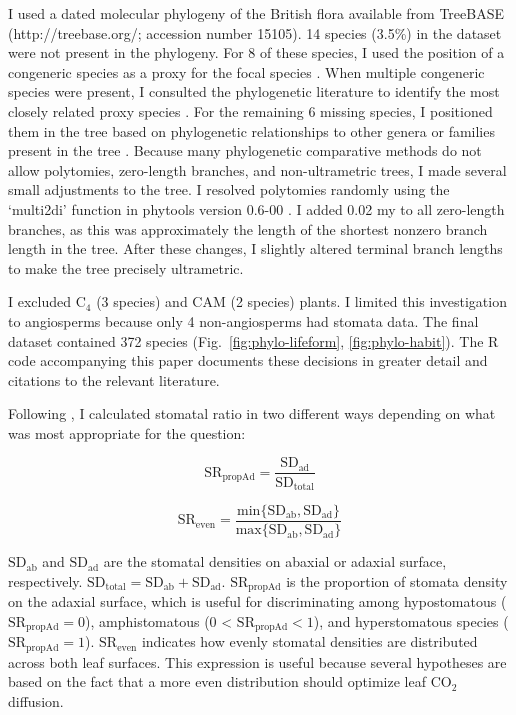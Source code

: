 \documentclass[12pt, oneside]{article}
\newcommand{\pkg}[1]{{\fontseries{b}\selectfont #1}}
\begin{document}
I used a dated molecular phylogeny of the British flora \citep{Lim_etal_2014} available from TreeBASE (http://treebase.org/; accession number 15105). 14 species (3.5\%) in the dataset were not present in the phylogeny. For 8 of these species, I used the position of a congeneric species as a proxy for the focal species \citep[following][]{Pennell_etal_2016}. When multiple congeneric species were present, I consulted the phylogenetic literature to identify the most closely related proxy species \citep{Scheen_etal_2004, Salmaki_etal_2013}. For the remaining 6 missing species, I positioned them in the tree based on phylogenetic relationships to other genera or families present in the tree \citep{Fior_etal_2006}. Because many phylogenetic comparative methods do not allow polytomies, zero-length branches, and non-ultrametric trees, I made several small adjustments to the tree. I resolved polytomies randomly using the `multi2di' function in \pkg{phytools} version 0.6-00 \citep{Revell_2012}. I added 0.02 my to all zero-length branches, as this was approximately the length of the shortest nonzero branch length in the tree. After these changes, I slightly altered terminal branch lengths to make the tree precisely ultrametric.

I excluded C$_4$ (3 species) and CAM (2 species) plants. I limited this investigation to angiosperms because only 4 non-angiosperms had stomata data. The final dataset contained 372 species (Fig.~\ref{fig:phylo-lifeform}, \ref{fig:phylo-habit}). The R code accompanying this paper documents these decisions in greater detail and citations to the relevant literature.

Following \cite{Muir_2015}, I calculated stomatal ratio in two different ways depending on what was most appropriate for the question: 

\begin{equation} \label{eq:SRpropAd} 
  \mathrm{SR_{propAd}} = \frac{\mathrm{SD_{ad}}}{\mathrm{SD_{total}}}
\end{equation}

\begin{equation} \label{eq:SReven1} 
  \mathrm{SR_{even}} = \frac{\mathrm{min}\{\mathrm{SD_{ab}}, \mathrm{SD_{ad}}\}}{\mathrm{max}\{\mathrm{SD_{ab}}, \mathrm{SD_{ad}}\}}
\end{equation}

$\mathrm{SD_{ab}}$ and $\mathrm{SD_{ad}}$ are the stomatal densities on abaxial or adaxial surface, respectively. $\mathrm{SD_{total}} = \mathrm{SD_{ab}} + \mathrm{SD_{ad}}$. $\mathrm{SR_{propAd}}$ is the proportion of stomata density on the adaxial surface, which is useful for discriminating among hypostomatous ($\mathrm{SR_{propAd}} = 0$), amphistomatous (0 < $\mathrm{SR_{propAd}} < 1$), and hyperstomatous species ($\mathrm{SR_\mathrm{propAd}} = 1$). $\mathrm{SR_\mathrm{even}}$ indicates how evenly stomatal densities are distributed across both leaf surfaces. This expression is useful because several hypotheses are based on the fact that a more even distribution should optimize leaf CO$_2$ diffusion.
\end{document}
